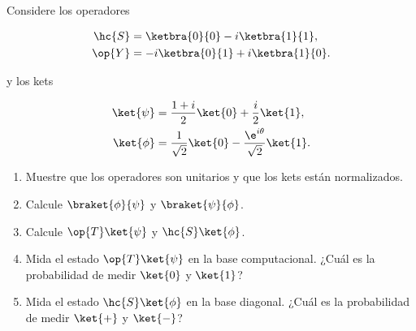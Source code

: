 \documentclass[./../main.tex]{subfiles}
\begin{document}

    \section{}
    Considere los operadores

    \begin{align*}
        \hc{S} &= \ketbra{0}{0} - i\ketbra{1}{1},\\
        \op{Y} &= -i\ketbra{0}{1} + i\ketbra{1}{0}.
    \end{align*}

    y los kets

    \begin{align*}
        \ket{\psi} &= \dfrac{1 + i}{2}\ket{0} + \dfrac{i}{2}\ket{1},\\
        \ket{\phi} &= \dfrac{1}{\sqrt{2}}\ket{0} - \dfrac{\e^{i\theta}}{\sqrt{2}}\ket{1}.
    \end{align*}

    \begin{enumerate}
        \item Muestre que los operadores son unitarios y que los kets están normalizados.
        \item Calcule \(\braket{\phi}{\psi}\) y \(\braket{\psi}{\phi}\).
        \item Calcule \(\op{T}\ket{\psi}\) y \(\hc{S}\ket{\phi}\).
        \item Mida el estado \(\op{T}\ket{\psi}\) en la base computacional. ¿Cuál es la probabilidad de medir \(\ket{0}\) y \(\ket{1}\)?
        \item Mida el estado \(\hc{S}\ket{\phi}\) en la base diagonal. ¿Cuál es la probabilidad de medir \(\ket{+}\) y \(\ket{-}\)?
    \end{enumerate}
\end{document}
